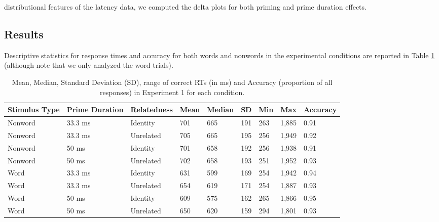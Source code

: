 \documentclass[
  english,
  man,floatsintext]{apa6}
\begin{document}
distributional features of the latency data, we computed the delta plots for both priming and prime duration effects.

\hypertarget{results}{%
\subsection{Results}\label{results}}

Descriptive statistics for response times and accuracy for both words and nonwords in the experimental conditions are reported in Table \ref{tab:exp1-descriptive-rt-table} (although note that we only analyzed the word trials).



\begin{table}[tbp]

\begin{center}
\begin{threeparttable}

\caption{\label{tab:exp1-descriptive-rt-table}Mean, Median, Standard Deviation (SD), range of correct RTs (in ms) and Accuracy (proportion of all responses) in Experiment 1 for each condition.}

\begin{tabular}{lllllllll}
\toprule
Stimulus Type & \multicolumn{1}{c}{Prime Duration} & \multicolumn{1}{c}{Relatedness} & \multicolumn{1}{c}{Mean} & \multicolumn{1}{c}{Median} & \multicolumn{1}{c}{SD} & \multicolumn{1}{c}{Min} & \multicolumn{1}{c}{Max} & \multicolumn{1}{c}{Accuracy}\\
\midrule
Nonword & 33.3 ms & Identity & 701 & 665 & 191 & 263 & 1,885 & 0.91\\
Nonword & 33.3 ms & Unrelated & 705 & 665 & 195 & 256 & 1,949 & 0.92\\
Nonword & 50 ms & Identity & 701 & 658 & 192 & 256 & 1,938 & 0.91\\
Nonword & 50 ms & Unrelated & 702 & 658 & 193 & 251 & 1,952 & 0.93\\
Word & 33.3 ms & Identity & 631 & 599 & 169 & 254 & 1,942 & 0.94\\
Word & 33.3 ms & Unrelated & 654 & 619 & 171 & 254 & 1,887 & 0.93\\
Word & 50 ms & Identity & 609 & 575 & 162 & 265 & 1,866 & 0.95\\
Word & 50 ms & Unrelated & 650 & 620 & 159 & 294 & 1,801 & 0.93\\
\bottomrule
\end{tabular}

\end{threeparttable}
\end{center}

\end{table}
\end{document}
